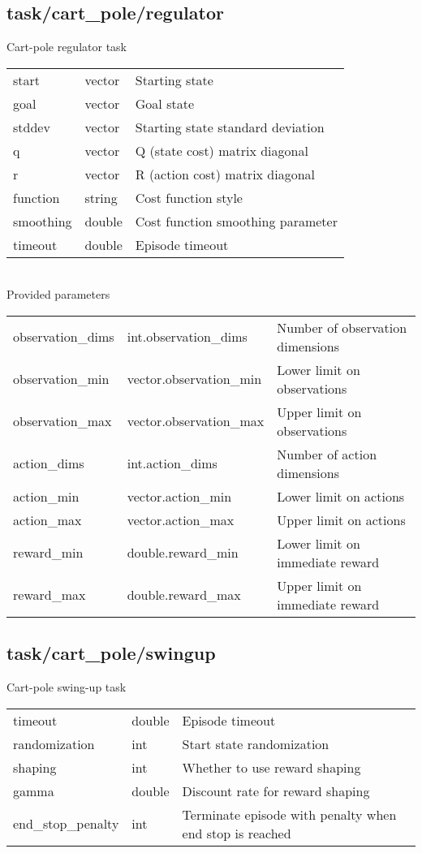 \subsection{task/cart\_pole/regulator}
\noindent Cart-pole regulator task\\

\noindent\begin{tabular}{@{}lll@{}}
start&vector&Starting state\\
goal&vector&Goal state\\
stddev&vector&Starting state standard deviation\\
q&vector&Q (state cost) matrix diagonal\\
r&vector&R (action cost) matrix diagonal\\
function&string&Cost function style\\
smoothing&double&Cost function smoothing parameter\\
timeout&double&Episode timeout\\
\end{tabular}
\\

\noindent Provided parameters\\

\noindent\begin{tabular}{@{}lll@{}}
observation\_dims&int.observation\_dims&Number of observation dimensions\\
observation\_min&vector.observation\_min&Lower limit on observations\\
observation\_max&vector.observation\_max&Upper limit on observations\\
action\_dims&int.action\_dims&Number of action dimensions\\
action\_min&vector.action\_min&Lower limit on actions\\
action\_max&vector.action\_max&Upper limit on actions\\
reward\_min&double.reward\_min&Lower limit on immediate reward\\
reward\_max&double.reward\_max&Upper limit on immediate reward\\
\end{tabular}
\subsection{task/cart\_pole/swingup}
\noindent Cart-pole swing-up task\\

\noindent\begin{tabular}{@{}lll@{}}
timeout&double&Episode timeout\\
randomization&int&Start state randomization\\
shaping&int&Whether to use reward shaping\\
gamma&double&Discount rate for reward shaping\\
end\_stop\_penalty&int&Terminate episode with penalty when end stop is reached\\
\end{tabular}
\\


